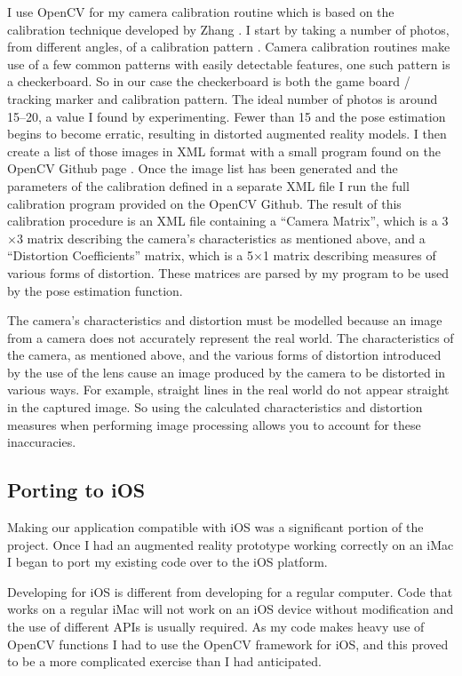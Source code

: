 \documentclass{article}
\begin{document}
I use OpenCV for my camera calibration routine which is based on the calibration technique developed by Zhang \cite{zhang}. I start by taking a number of photos, from different angles, of a calibration pattern \cite{calib2}. Camera calibration routines make use of a few common patterns with easily detectable features, one such pattern is a checkerboard. So in our case the checkerboard is both the game board / tracking marker and calibration pattern. The ideal number of photos is around 15--20, a value I found by experimenting. Fewer than 15 and the pose estimation begins to become erratic, resulting in distorted augmented reality models. I then create a list of those images in XML format with a small program found on the OpenCV Github page \cite{opencvGit}. Once the image list has been generated and the parameters of the calibration defined in a separate XML file I run the full calibration program provided on the OpenCV Github. The result of this calibration procedure is an XML file containing a “Camera Matrix”, which is a 3$\times$3 matrix describing the camera's characteristics as mentioned above, and a “Distortion Coefficients” matrix, which is a 5$\times$1 matrix describing measures of various forms of distortion. These matrices are parsed by my program to be used by the pose estimation function. 

The camera's characteristics and distortion must be modelled  because an image from a camera does not accurately represent the real world. The characteristics of the camera, as mentioned above, and the various forms of distortion introduced by the use of the lens cause an image produced by the camera to be distorted in various ways. For example, straight lines in the real world do not appear straight in the captured image. So using the calculated characteristics and distortion measures when performing image processing allows you to account for these inaccuracies.


\subsection{Porting to iOS}

Making our application compatible with iOS was a significant portion of the project. Once I had an augmented reality prototype working correctly on an iMac I began to port my existing code over to the iOS platform. \par

Developing for iOS is different from developing for a regular computer. Code that works on a regular iMac will not work on an iOS device without modification and the use of different APIs is usually required. As my code makes heavy use of OpenCV functions I had to use the OpenCV framework for iOS, and this proved to be a more complicated exercise than I had anticipated. \par
\end{document}
